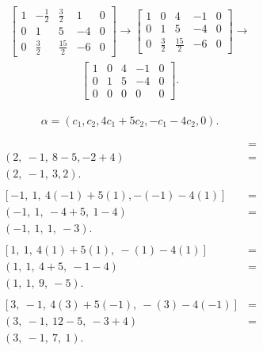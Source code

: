 \documentclass[12pt]{article}
\begin{document}
\begin{enumerate}
\begin{align*}
        \begin{bmatrix}
          1 & -\frac{1}{2} & \frac{3}{2} & 1 & 0\\
          0 & 1 & 5 & -4 & 0\\
          0 & \frac{3}{2} & \frac{15}{2} & -6 & 0
        \end{bmatrix}
        \xrightarrow{}
        \begin{bmatrix}
          1 & 0 & 4 & -1 & 0\\
          0 & 1 & 5 & -4 & 0\\
          0 & \frac{3}{2} & \frac{15}{2} & -6 & 0
        \end{bmatrix}
        \xrightarrow{}
      \end{align*}
      \begin{align*}
        \begin{bmatrix}
          1 & 0 & 4 & -1 & 0\\
          0 & 1 & 5 & -4 & 0\\
          0 & 0 & 0 & 0 & 0
        \end{bmatrix}.
      \end{align*}

      \begin{align*}
        \alpha = (c_1,c_2,4c_1+5c_2,-c_1-4c_2,0).
      \end{align*}

      \begin{align*}
        [2,\ -1,\ 4(2) + 5(-1), -2 -4(-1)] &=\\
        (2,\ -1,\ 8 - 5, -2 +4) &=\\
        (2,\ -1,\ 3, 2).\\\\
        [-1,\ 1,\ 4(-1) + 5(1),-(-1) - 4(1)] &=\\
        (-1,\ 1,\ -4 + 5,\ 1 - 4) &=\\
        (-1,\ 1,\ 1,\ -3).\\\\
        [1,\ 1,\ 4(1) + 5(1),\ -(1) - 4(1)] &=\\
        (1,\ 1,\ 4 + 5,\ -1 - 4) &=\\
        (1,\ 1,\ 9,\ -5).\\\\
        [3,\ -1,\ 4(3) + 5(-1),\ -(3) -4(-1)] &=\\
        (3,\ -1,\ 12 - 5,\ -3 +4) &=\\
        (3,\ -1,\ 7,\ 1).
      \end{align*}


\end{enumerate}
\end{document}
